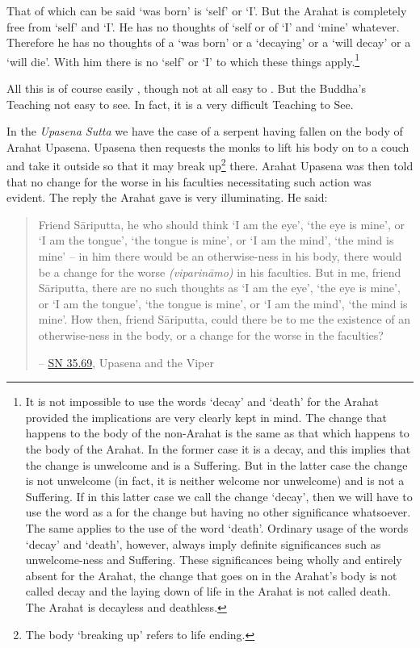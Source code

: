 That of which can be said `was born' is `self' or `I'. But the Arahat is completely free from `self' and `I'. He has no thoughts of `self or of `I' and `mine' whatever. Therefore he has no thoughts of a `was born' or a `decaying' or a `will decay' or a `will die'. With him there is no `self' or `I' to which  these things apply.\footnote{It is not impossible to use the words `decay' and `death' for the Arahat provided the implications are very clearly kept in mind. The change that happens to the body of the non-Arahat is the same as that which happens to the body of the Arahat. In the former case it is a decay, and this implies that the change is unwelcome and is a Suffering. But in the latter case the change is not unwelcome (in fact, it is neither welcome nor unwelcome) and is not a Suffering. If in this latter case we call the change `decay', then we will have to use the word  as a  for the change but having no other significance whatsoever. The same applies to the use of the word `death'. Ordinary usage of the words `decay' and `death', however, always imply definite significances such as unwelcome-ness and Suffering. These significances being wholly and entirely absent for the Arahat, the change that goes on in the Arahat's body is not called decay and the laying down of life in the Arahat is not called death. The Arahat is decayless and deathless.}

All this is of course easily , though not at all easy to . But the Buddha's Teaching  not easy to see. In fact, it is a very difficult Teaching to See.

In the \emph{Upasena Sutta} we have the case of a serpent having fallen on the body of Arahat Upasena. Upasena then requests the monks to lift his body on to a couch and take it outside so that it may break up\footnote{The body `breaking up' refers to life ending.} there. Arahat Upasena was then told that no change for the worse in his faculties necessitating such action was evident. The reply the Arahat gave is very illuminating. He said:

\begin{quote}
Friend Sāriputta, he who should think `I am the eye', `the eye is mine', or `I am the tongue', `the tongue is mine', or `I am the mind', `the mind is mine' -- in him there would be an otherwise-ness in his body, there would be a change for the worse \emph{(viparināmo)} in his faculties. But in me, friend Sāriputta, there are no such thoughts as `I am the eye', `the eye is mine', or `I am the tongue', `the tongue is mine', or `I am the mind', `the mind is mine'. How then, friend Sāriputta, could there be to me the existence of an otherwise-ness in the body, or a change for the worse in the faculties?

 -- \href{https://suttacentral.net/sn35.69/en/sujato}{SN 35.69}, Upasena and the Viper
\end{quote}

